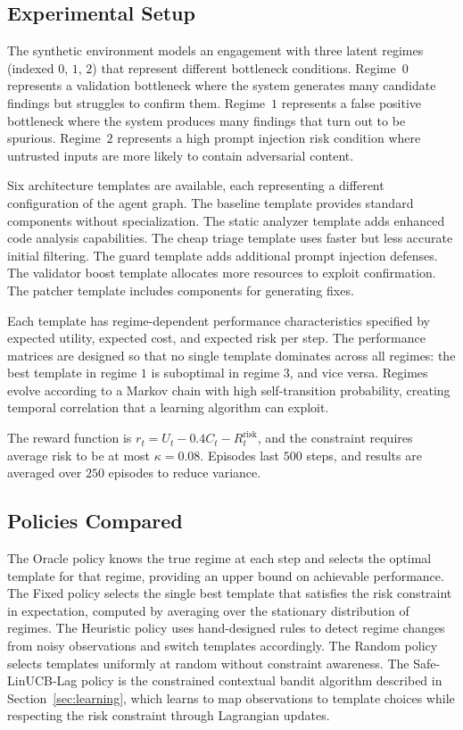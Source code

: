 \documentclass[sigconf,anonymous]{acmart}
\newcommand{\secref}[1]{Section~\ref{#1}}
\begin{document}
\subsection{Experimental Setup}

The synthetic environment models an engagement with three latent regimes (indexed $0$, $1$, $2$) that represent different bottleneck conditions. Regime~$0$ represents a validation bottleneck where the system generates many candidate findings but struggles to confirm them. Regime~$1$ represents a false positive bottleneck where the system produces many findings that turn out to be spurious. Regime~$2$ represents a high prompt injection risk condition where untrusted inputs are more likely to contain adversarial content.

Six architecture templates are available, each representing a different configuration of the agent graph. The baseline template provides standard components without specialization. The static analyzer template adds enhanced code analysis capabilities. The cheap triage template uses faster but less accurate initial filtering. The guard template adds additional prompt injection defenses. The validator boost template allocates more resources to exploit confirmation. The patcher template includes components for generating fixes.

Each template has regime-dependent performance characteristics specified by expected utility, expected cost, and expected risk per step. The performance matrices are designed so that no single template dominates across all regimes: the best template in regime $1$ is suboptimal in regime $3$, and vice versa. Regimes evolve according to a Markov chain with high self-transition probability, creating temporal correlation that a learning algorithm can exploit.

The reward function is $r_t = U_t - 0.4 C_t - R_t^{\text{risk}}$, and the constraint requires average risk to be at most $\kappa = 0.08$. Episodes last $500$ steps, and results are averaged over $250$ episodes to reduce variance.

\subsection{Policies Compared}

The Oracle policy knows the true regime at each step and selects the optimal template for that regime, providing an upper bound on achievable performance. The Fixed policy selects the single best template that satisfies the risk constraint in expectation, computed by averaging over the stationary distribution of regimes. The Heuristic policy uses hand-designed rules to detect regime changes from noisy observations and switch templates accordingly. The Random policy selects templates uniformly at random without constraint awareness. The Safe-LinUCB-Lag policy is the constrained contextual bandit algorithm described in \secref{sec:learning}, which learns to map observations to template choices while respecting the risk constraint through Lagrangian updates.
\end{document}
